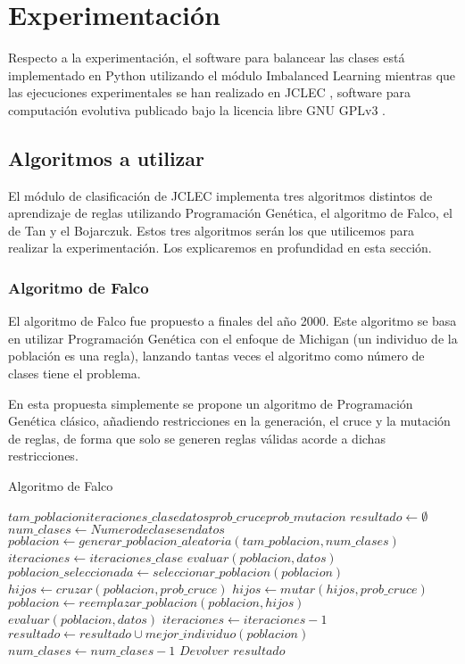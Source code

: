 \section{Experimentación}

Respecto a la experimentación, el software para balancear las clases está implementado en Python utilizando el módulo Imbalanced Learning\cite{imblearn} mientras que las ejecuciones experimentales se han realizado en JCLEC \cite{jclec}, software para computación evolutiva publicado bajo la licencia libre GNU GPLv3 \cite{gplv3}.


\subsection{Algoritmos a utilizar}

El módulo de clasificación de JCLEC implementa tres algoritmos distintos de aprendizaje de reglas utilizando Programación Genética, el algoritmo de Falco, el de Tan y el Bojarczuk. Estos tres algoritmos serán los que utilicemos para realizar la experimentación. Los explicaremos en profundidad en esta sección.

\subsubsection{Algoritmo de Falco}

El algoritmo de Falco \cite{algoritmoFalco} fue propuesto a finales del año 2000. Este algoritmo se basa en utilizar Programación Genética con el enfoque de Michigan (un individuo de la población es una regla), lanzando tantas veces el algoritmo como número de clases tiene el problema.

En esta propuesta simplemente se propone un algoritmo de Programación Genética clásico, añadiendo restricciones en la generación, el cruce y la mutación de reglas, de forma que solo se generen reglas válidas acorde a dichas restricciones.

\begin{algorithm}
\caption{Algoritmo de Falco}\label{alg:falco}
\begin{algorithmic}
	\Require $tam\_poblacion iteraciones\_clase datos prob\_cruce prob\_mutacion$
	\State $resultado \gets \emptyset$
	\State $num\_clases \gets Numero de clases en datos$
		\State $poblacion \gets generar\_poblacion\_aleatoria(tam\_poblacion, num\_clases)$ 
		\State $iteraciones \gets iteraciones\_clase$
		\State $evaluar(poblacion, datos)$
			\State $poblacion\_seleccionada \gets seleccionar\_poblacion(poblacion)$
			\State $hijos \gets cruzar(poblacion, prob\_cruce)$
			\State $hijos \gets mutar(hijos, prob\_cruce)$
			\State $poblacion \gets reemplazar\_poblacion(poblacion, hijos)$ 
			\State $evaluar(poblacion, datos)$
			\State $iteraciones \gets iteraciones - 1$
		\EndWhile
		\State $resultado \gets resultado \cup mejor\_individuo(poblacion)$
		\State $num\_clases \gets num\_clases - 1$
	\EndWhile
	\State $Devolver$ $resultado$
\end{algorithmic}
\end{algorithm}

